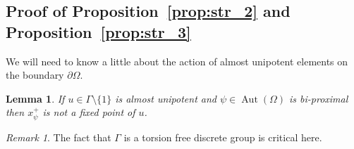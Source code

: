 \documentclass[12pt]{amsart}
\theoremstyle{plain}
\newtheorem{lemma}[proposition]{Lemma}
\theoremstyle{definition}
\theoremstyle{remark}
\newtheorem{remark}[proposition]{Remark}
\begin{document}
\subsection{Proof of Proposition~\ref{prop:str_2} and Proposition~\ref{prop:str_3}} We will need to know a little about the action of almost unipotent elements on the boundary $\partial \Omega$.

\begin{lemma}
\label{lem:u_1}
If $u \in \Gamma \setminus \{1\}$ is almost unipotent and $\psi \in \operatorname{Aut}(\Omega)$ is bi-proximal then $x^+_{\psi}$ is not a fixed point of $u$.
\end{lemma}

\begin{remark} The fact that $\Gamma$ is a torsion free discrete group is critical here. \end{remark}
\end{document}
